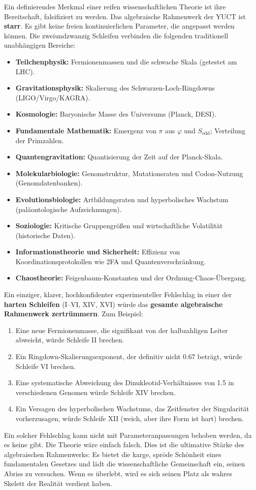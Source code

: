 \documentclass[12pt,a4paper]{article}
\begin{document}
	Ein definierendes Merkmal einer reifen wissenschaftlichen Theorie ist ihre Bereitschaft, falsifiziert zu werden. Das algebraische Rahmenwerk der YUCT ist \textbf{starr}. Es gibt keine freien kontinuierlichen Parameter, die angepasst werden können. Die zweiundzwanzig Schleifen verbinden die folgenden traditionell unabhängigen Bereiche:
	\begin{itemize}
		\item \textbf{Teilchenphysik:} Fermionenmassen und die schwache Skala (getestet am LHC).
		\item \textbf{Gravitationsphysik:} Skalierung des Schwarzen-Loch-Ringdowns (LIGO/Virgo/KAGRA).
		\item \textbf{Kosmologie:} Baryonische Masse des Universums (Planck, DESI).
		\item \textbf{Fundamentale Mathematik:} Emergenz von \(\pi\) aus \(\varphi\) und \(S_{\mathrm{odd}}\); Verteilung der Primzahlen.
		\item \textbf{Quantengravitation:} Quantisierung der Zeit auf der Planck-Skala.
		\item \textbf{Molekularbiologie:} Genomstruktur, Mutationsraten und Codon-Nutzung (Genomdatenbanken).
		\item \textbf{Evolutionsbiologie:} Artbildungsraten und hyperbolisches Wachstum (paläontologische Aufzeichnungen).
		\item \textbf{Soziologie:} Kritische Gruppengrößen und wirtschaftliche Volatilität (historische Daten).
		\item \textbf{Informationstheorie und Sicherheit:} Effizienz von Koordinationsprotokollen wie 2FA und Quantenverschränkung.
		\item \textbf{Chaostheorie:} Feigenbaum-Konstanten und der Ordnung-Chaos-Übergang.
	\end{itemize}
	Ein einziger, klarer, hochkonfidenter experimenteller Fehlschlag in einer der \textbf{harten Schleifen} (I–VI, XIV, XVI) würde das \textbf{gesamte algebraische Rahmenwerk zertrümmern}. Zum Beispiel:
	\begin{enumerate}
		\item Eine neue Fermionenmasse, die signifikant von der halbzahligen Leiter abweicht, würde Schleife II brechen.
		\item Ein Ringdown-Skalierungsexponent, der definitiv nicht \(0.67\) beträgt, würde Schleife VI brechen.
		\item Eine systematische Abweichung des Dinukleotid-Verhältnisses von 1.5 in verschiedenen Genomen würde Schleife XIV brechen.
		\item Ein Versagen des hyperbolischen Wachstums, das Zeitfenster der Singularität vorherzusagen, würde Schleife XII (weich, aber ihre Form ist hart) brechen.
	\end{enumerate}
	Ein solcher Fehlschlag kann nicht mit Parameteranpassungen behoben werden, da es keine gibt. Die Theorie wäre einfach falsch. Dies ist die ultimative Stärke des algebraischen Rahmenwerks: Es bietet die karge, spröde Schönheit eines fundamentalen Gesetzes und lädt die wissenschaftliche Gemeinschaft ein, seinen Abriss zu versuchen. Wenn es überlebt, wird es sich seinen Platz als wahres Skelett der Realität verdient haben.
	
\end{document}

